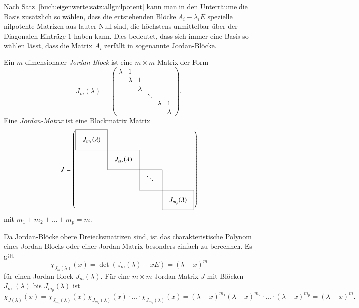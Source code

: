 Nach Satz~\ref{buch:eigenwerte:satz:allgnilpotent}
kann man in den Unterräume die Basis zusätzlich so wählen, dass 
die entstehenden Blöcke $A_i-\lambda_i E$ spezielle nilpotente Matrizen
aus lauter Null sind, die höchstens unmittelbar über der Diagonalen
Einträge $1$ haben kann.
Dies bedeutet, dass sich immer eine Basis so wählen lässt, dass die
Matrix $A_i$ zerfällt in sogenannte Jordan-Blöcke.

\begin{definition}
Ein $m$-dimensionaler {\em Jordan-Block} ist eine $m\times m$-Matrix
%
der Form
\[
J_m(\lambda)
=
\begin{pmatrix}
\lambda &    1    &         &        &         &         \\
        & \lambda &    1    &        &         &         \\
        &         & \lambda &        &         &         \\
        &         &         & \ddots &         &         \\
        &         &         &        & \lambda &     1   \\
        &         &         &        &         & \lambda 
\end{pmatrix}.
\]
Eine {\em Jordan-Matrix} ist eine Blockmatrix Matrix
\[
J
=
\def\temp#1{\multicolumn{1}{|c}{\raisebox{0pt}[17pt][12pt]{\phantom{x}$#1\mathstrut$}\phantom{x}}}
\left(
\begin{array}{cccc}
\cline{1-1}
\temp{J_{m_1}(\lambda)} &\multicolumn{1}{|c}{}&        &           \\
\cline{1-2}
          &\temp{J_{m_2}(\lambda)}&\multicolumn{1}{|c}{}&           \\
\cline{2-3}
          &           &\temp{\ddots}&\multicolumn{1}{|c}{}\\
\cline{3-4}
          &           &        &\multicolumn{1}{|c|}{\raisebox{0pt}[17pt][12pt]{\phantom{x}$J_{m_p}(\lambda)$}\phantom{x}}\\
\cline{4-4}
\end{array}
\right)
\]
mit $m_1+m_2+\dots+m_p=m$.
%
\end{definition}

Da Jordan-Blöcke obere Dreiecksmatrizen sind, ist
das charakteristische Polynom eines Jordan-Blocks oder einer Jordan-Matrix
besonders einfach zu berechnen.
Es gilt
\[
\chi_{J_m(\lambda)}(x)
=
\det (J_m(\lambda) - xE)
=
(\lambda-x)^m
\]
für einen Jordan-Block $J_m(\lambda)$.
Für eine $m\times m$-Jordan-Matrix $J$ mit Blöcken $J_{m_1}(\lambda)$
bis $J_{m_p}(\lambda)$ ist
\[
\chi_{J(\lambda)}(x)
=
\chi_{J_{m_1}(\lambda)}(x)
\chi_{J_{m_2}(\lambda)}(x)
\cdot
\dots
\cdot
\chi_{J_{m_p}(\lambda)}(x)
=
(\lambda-x)^{m_1}
(\lambda-x)^{m_2}
\cdot\dots\cdot
(\lambda-x)^{m_p}
=
(\lambda-x)^m.
\]

